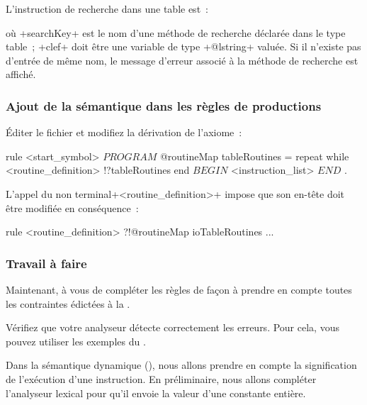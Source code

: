 L'instruction de recherche dans une table est~:
\begin{galgas3}
\end{galgas3}
où \ggst+searchKey+ est le nom d'une méthode de recherche déclarée dans le type table~; \ggst+clef+ doit être une variable de type \ggst+@lstring+ valuée. Si il n'existe pas d'entrée de même nom, le message d'erreur associé à la méthode de recherche est affiché.

\subsubsection{Ajout de la sémantique dans les règles de productions}
Éditer le fichier  et modifiez la dérivation de l'axiome~:

\begin{galgas3}
rule <start_symbol> {
  $PROGRAM$
  @routineMap tableRoutines = {}
  repeat
  while
    <routine_definition> !?tableRoutines
  end
  $BEGIN$
  <instruction_list>
  $END$
  $.$
}
\end{galgas3}

L'appel du non terminal\ggst+<routine_definition>+ impose que son en-tête doit être modifiée en conséquence~:
\begin{galgas3}
rule <routine_definition> ?!@routineMap ioTableRoutines {
  ...
}
\end{galgas3}

\subsubsection{Travail à faire}
Maintenant, à vous de compléter les règles de façon à prendre en compte toutes les contraintes édictées à la .

Vérifiez que votre analyseur détecte correctement les erreurs. Pour cela, vous pouvez utiliser les exemples du .









Dans la sémantique dynamique (), nous allons prendre en compte la signification de l'exécution d'une instruction. En préliminaire, nous allons compléter l'analyseur lexical pour qu'il envoie la valeur d'une constante entière.

